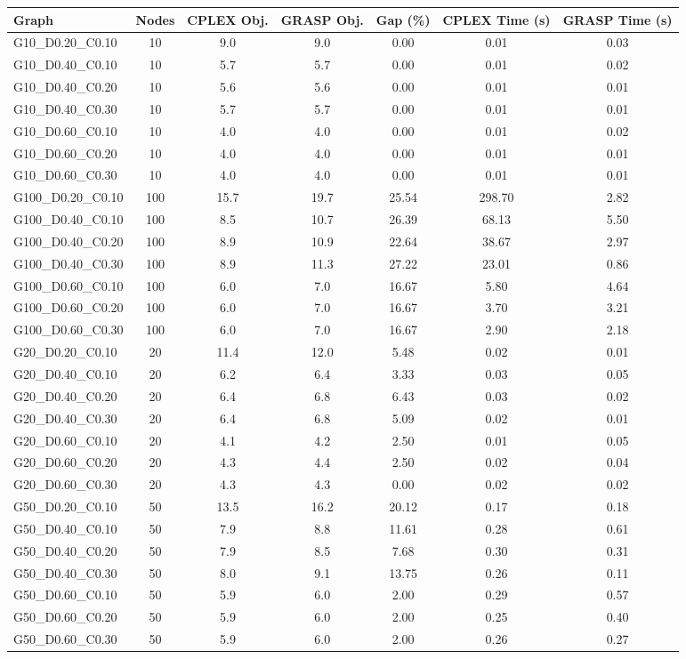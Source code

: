 \begin{tabular}{|l|c|c|c|c|c|c|}
\hline
\textbf{Graph} & \textbf{Nodes} & \textbf{CPLEX Obj.} & \textbf{GRASP Obj.} & \textbf{Gap (\%)} & \textbf{CPLEX Time (s)} & \textbf{GRASP Time (s)} \\
\hline
G10_D0.20_C0.10 & 
10 & 
9.0 & 
9.0 & 
0.00 & 
0.01 & 
0.03 \\
G10_D0.40_C0.10 & 
10 & 
5.7 & 
5.7 & 
0.00 & 
0.01 & 
0.02 \\
G10_D0.40_C0.20 & 
10 & 
5.6 & 
5.6 & 
0.00 & 
0.01 & 
0.01 \\
G10_D0.40_C0.30 & 
10 & 
5.7 & 
5.7 & 
0.00 & 
0.01 & 
0.01 \\
G10_D0.60_C0.10 & 
10 & 
4.0 & 
4.0 & 
0.00 & 
0.01 & 
0.02 \\
G10_D0.60_C0.20 & 
10 & 
4.0 & 
4.0 & 
0.00 & 
0.01 & 
0.01 \\
G10_D0.60_C0.30 & 
10 & 
4.0 & 
4.0 & 
0.00 & 
0.01 & 
0.01 \\
G100_D0.20_C0.10 & 
100 & 
15.7 & 
19.7 & 
25.54 & 
298.70 & 
2.82 \\
G100_D0.40_C0.10 & 
100 & 
8.5 & 
10.7 & 
26.39 & 
68.13 & 
5.50 \\
G100_D0.40_C0.20 & 
100 & 
8.9 & 
10.9 & 
22.64 & 
38.67 & 
2.97 \\
G100_D0.40_C0.30 & 
100 & 
8.9 & 
11.3 & 
27.22 & 
23.01 & 
0.86 \\
G100_D0.60_C0.10 & 
100 & 
6.0 & 
7.0 & 
16.67 & 
5.80 & 
4.64 \\
G100_D0.60_C0.20 & 
100 & 
6.0 & 
7.0 & 
16.67 & 
3.70 & 
3.21 \\
G100_D0.60_C0.30 & 
100 & 
6.0 & 
7.0 & 
16.67 & 
2.90 & 
2.18 \\
G20_D0.20_C0.10 & 
20 & 
11.4 & 
12.0 & 
5.48 & 
0.02 & 
0.01 \\
G20_D0.40_C0.10 & 
20 & 
6.2 & 
6.4 & 
3.33 & 
0.03 & 
0.05 \\
G20_D0.40_C0.20 & 
20 & 
6.4 & 
6.8 & 
6.43 & 
0.03 & 
0.02 \\
G20_D0.40_C0.30 & 
20 & 
6.4 & 
6.8 & 
5.09 & 
0.02 & 
0.01 \\
G20_D0.60_C0.10 & 
20 & 
4.1 & 
4.2 & 
2.50 & 
0.01 & 
0.05 \\
G20_D0.60_C0.20 & 
20 & 
4.3 & 
4.4 & 
2.50 & 
0.02 & 
0.04 \\
G20_D0.60_C0.30 & 
20 & 
4.3 & 
4.3 & 
0.00 & 
0.02 & 
0.02 \\
G50_D0.20_C0.10 & 
50 & 
13.5 & 
16.2 & 
20.12 & 
0.17 & 
0.18 \\
G50_D0.40_C0.10 & 
50 & 
7.9 & 
8.8 & 
11.61 & 
0.28 & 
0.61 \\
G50_D0.40_C0.20 & 
50 & 
7.9 & 
8.5 & 
7.68 & 
0.30 & 
0.31 \\
G50_D0.40_C0.30 & 
50 & 
8.0 & 
9.1 & 
13.75 & 
0.26 & 
0.11 \\
G50_D0.60_C0.10 & 
50 & 
5.9 & 
6.0 & 
2.00 & 
0.29 & 
0.57 \\
G50_D0.60_C0.20 & 
50 & 
5.9 & 
6.0 & 
2.00 & 
0.25 & 
0.40 \\
G50_D0.60_C0.30 & 
50 & 
5.9 & 
6.0 & 
2.00 & 
0.26 & 
0.27 \\
\hline
\end{tabular}
